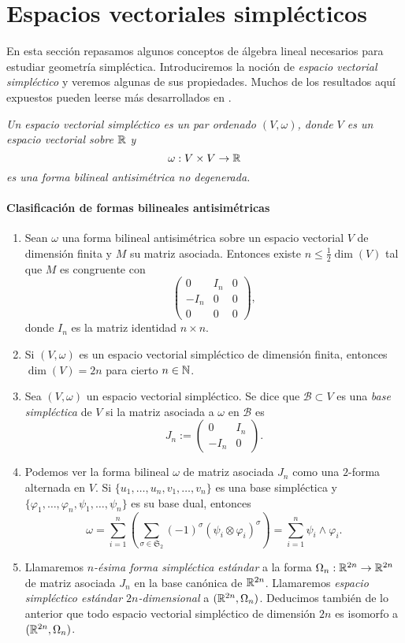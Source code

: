 \section{Espacios vectoriales simplécticos}\label{sec:vectoriales}
En esta sección repasamos algunos conceptos de álgebra lineal necesarios para estudiar geometría simpléctica. Introduciremos la noción de \emph{espacio vectorial simpléctico} y veremos algunas de sus propiedades. Muchos de los resultados aquí expuestos pueden leerse más desarrollados en \cite{algebra}.
\begin{defn}
  \em
Un \emph{espacio vectorial simpléctico} es un par ordenado $(V,\omega)$, donde $V$ es un espacio vectorial sobre $\mathbb{R}$ y 
	\[
	  \omega: V \times V \rightarrow \mathbb{R}
	\]
	es una forma bilineal antisimétrica no degenerada.
\end{defn}

\paragraph{\bf Clasificación de formas bilineales antisimétricas}
  \begin{enumerate}
    \item Sean $\omega$ una forma bilineal antisimétrica sobre un espacio vectorial $V$ de dimensión finita y $M$ su matriz asociada. Entonces existe $n \leq \frac{1}{2}\dim(V)$ tal que $M$ es congruente con
      \[
	\left(
	\begin{array}{ccc}
	  0 & I_n & 0 \\
	  -I_n & 0 & 0 \\
	  0 & 0 & 0
	\end{array}\right),
      \]
      donde $I_n$ es la matriz identidad $n \times n$.
    \item Si $(V,\omega)$ es un espacio vectorial simpléctico de dimensión finita, entonces $\dim(V)=2n$ para cierto $n \in \mathbb{N}$.
    \item Sea $(V,\omega)$ un espacio vectorial simpléctico. Se dice que $\mathcal{B}\subset V$ es una \emph{base simpléctica} de $V$ si la matriz asociada a $\omega$ en $\mathcal{B}$ es
\[
  J_n :=
\left(
	\begin{array}{cc}
	  0 & I_n  \\
	  -I_n & 0 
	\end{array}\right).
      \]
    \item Podemos ver la forma bilineal $\omega$ de matriz asociada $J_n$ como una $2$-forma alternada en $V$. Si $\{u_1,\dots,u_n,v_1,\dots,v_n\}$ es una base simpléctica y $\{\varphi_1,\dots, \varphi_n, \psi_1,\dots, \psi_n \}$ es su base dual, entonces
  \[
    \omega = \sum_{i=1}^n \left(\sum_{\sigma \in \mathfrak{S}_2} (-1)^{\sigma} (\psi_i \otimes \varphi_i)^{\sigma}\right)= \sum_{i=1}^n \psi_i \wedge \varphi_i.
  \]
  \item Llamaremos \emph{$n$-ésima forma simpléctica estándar} a la forma $\Omega_n:\mathbb{R}^{2n} \rightarrow \mathbb{R}^{2n}$ de matriz asociada $J_n$ en la base canónica de $\mathbb{R}^{2n}$. Llamaremos \emph{espacio simpléctico estándar $2n$-dimensional} a $(\mathbb{R}^{2n},\Omega_n)$. Deducimos también de lo anterior que todo espacio vectorial simpléctico de dimensión $2n$ es isomorfo a $(\mathbb{R}^{2n},\Omega_n)$.
\end{enumerate}
